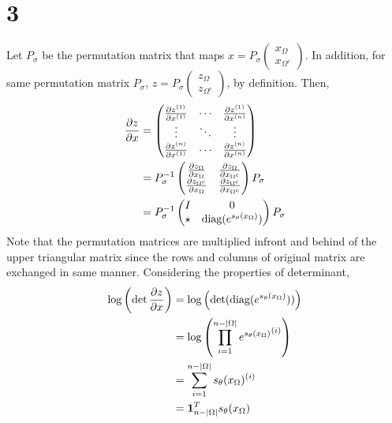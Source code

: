 \documentclass[10pt]{article}
\begin{document}
\section*{3}
Let $P_\sigma$ be the permutation matrix that maps $x = P_\sigma \begin{pmatrix} x_\Omega \\ x_{\Omega^c}\end{pmatrix}$. In addition, for same permutation matrix $P_\sigma$, $z = P_\sigma \begin{pmatrix} z_\Omega \\ z_{\Omega^c}\end{pmatrix}$, by definition.
Then,
\begin{align*}
    {\partial z \over \partial x} &= \begin{pmatrix}
        {\partial z^{(1)} \over \partial x^{(1)}} & \cdots & {\partial z^{(1)} \over \partial x^{(n)}} \\
        \vdots & \ddots & \vdots \\
        {\partial z^{(n)} \over \partial x^{(1)}} & \cdots & {\partial z^{(n)} \over \partial x^{(n)}}
    \end{pmatrix} \\
    &= P_\sigma^{-1} \begin{pmatrix}
        {\partial z_\Omega \over \partial x_\Omega} & {\partial z_\Omega \over \partial x_{\Omega^c}} \\
        {\partial z_{\Omega^c} \over \partial x_\Omega} & {\partial z_{\Omega^c} \over \partial x_{\Omega^c}}
    \end{pmatrix}P_\sigma \\
    &= P_\sigma^{-1} \begin{pmatrix}
        I & 0 \\ \star & \text{diag}(e^{s_\theta(x_\Omega)})
    \end{pmatrix}P_\sigma
\end{align*}
Note that the permutation matrices are multiplied infront and behind of the upper triangular matrix since the rows and columns of original matrix are exchanged in same manner.
Considering the properties of determinant,
\begin{align*}
    \log\left(\det {\partial z \over \partial x}\right) &= \log\left(\det(\text{diag}(e^{s_\theta(x_\Omega)}))\right)\\
    &= \log \left(\prod_{i=1}^{n - |\Omega|} {e^{s_\theta(x_\Omega)}}^{(i)}\right) \\
    &= \sum_{i=1}^{n - |\Omega|} s_\theta (x_\Omega)^{(i)}\\
    &= \mathbf{1}_{{n - |\Omega|}}^Ts_\theta (x_\Omega)
\end{align*}
\end{document}
